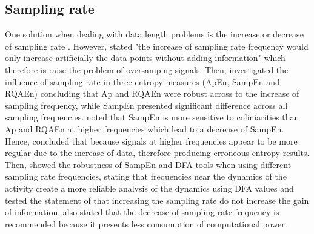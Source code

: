\subsection{Sampling rate}
One solution when dealing with data length problems is the increase 
or decrease of sampling rate \citep{caballero2014}.
However, \citealt[p. 267]{duarte2008} stated "the increase of sampling rate 
frequency would only increase artificially the data points without 
adding information" which therefore is raise the problem of 
oversamping signals. 
Then, \cite{rhea2011} investigated the influence of sampling rate in 
three entropy measures (ApEn, SampEn and RQAEn) concluding that
Ap and RQAEn were robust across to the increase of sampling frequency,
while SampEn presented significant difference across all sampling 
frequencies. \cite{rhea2011} noted that SampEn is more sensitive to 
coliniarities than Ap and RQAEn at higher frequencies which lead to a 
decrease of SampEn. Hence, \cite{rhea2011} concluded that because signals at 
higher frequencies appear to be more regular due to the increase of data, 
therefore producing erroneous entropy results.
%
Then, \cite{caballero2013} showed the robustness of SampEn and DFA tools
when using different sampling rate frequencies, stating that frequencies 
near the dynamics of the activity create a more reliable analysis of the 
dynamics using DFA values and tested the statement of \cite{duarte2008} 
that increasing the sampling rate do not increase the gain of information.
\cite{caballero2013} also stated that the decrease of sampling 
rate frequency is recommended because it presents less consumption 
of computational power.






